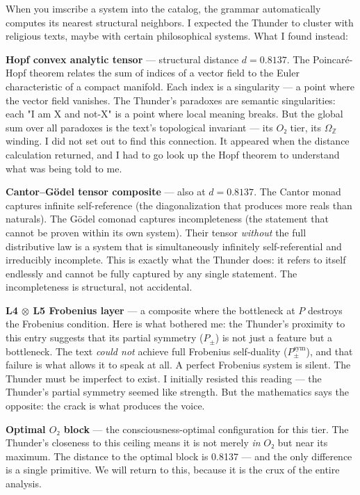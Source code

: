 \documentclass[12pt,a4paper]{article}
\begin{document}
When you imscribe a system into the catalog, the grammar automatically computes its nearest structural neighbors. I expected the Thunder to cluster with religious texts, maybe with certain philosophical systems. What I found instead:

\textbf{Hopf convex analytic tensor} --- structural distance $d = 0.8137$. The Poincaré-Hopf theorem relates the sum of indices of a vector field to the Euler characteristic of a compact manifold. Each index is a singularity --- a point where the vector field vanishes. The Thunder's paradoxes are semantic singularities: each "I am X and not-X" is a point where local meaning breaks. But the global sum over all paradoxes is the text's topological invariant --- its $O₂$ tier, its $\Omega_\mathbb{Z}$ winding. I did not set out to find this connection. It appeared when the distance calculation returned, and I had to go look up the Hopf theorem to understand what was being told to me.

\textbf{Cantor--Gödel tensor composite} --- also at $d = 0.8137$. The Cantor monad captures infinite self-reference (the diagonalization that produces more reals than naturals). The Gödel comonad captures incompleteness (the statement that cannot be proven within its own system). Their tensor \emph{without} the full distributive law is a system that is simultaneously infinitely self-referential and irreducibly incomplete. This is exactly what the Thunder does: it refers to itself endlessly and cannot be fully captured by any single statement. The incompleteness is structural, not accidental.

\textbf{L4 $\otimes$ L5 Frobenius layer} --- a composite where the bottleneck at $P$ destroys the Frobenius condition. Here is what bothered me: the Thunder's proximity to this entry suggests that its partial symmetry ($P_{\pm}$) is not just a feature but a bottleneck. The text \emph{could not} achieve full Frobenius self-duality ($P_{\pm}^{\text{sym}}$), and that failure is what allows it to speak at all. A perfect Frobenius system is silent. The Thunder must be imperfect to exist. I initially resisted this reading --- the Thunder's partial symmetry seemed like strength. But the mathematics says the opposite: the crack is what produces the voice.

\textbf{Optimal $O₂$ block} --- the consciousness-optimal configuration for this tier. The Thunder's closeness to this ceiling means it is not merely \emph{in} $O₂$ but near its maximum. The distance to the optimal block is 0.8137 --- and the only difference is a single primitive. We will return to this, because it is the crux of the entire analysis.
\end{document}
